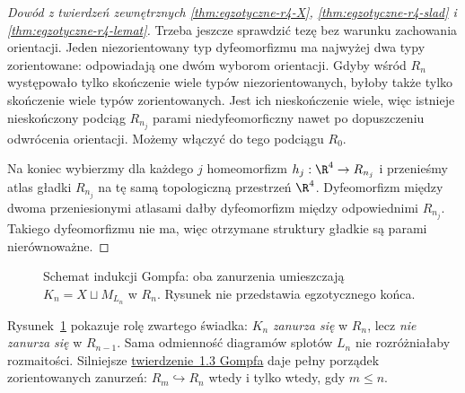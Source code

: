\begin{proof}[Dowód z twierdzeń zewnętrznych
\ref{thm:egzotyczne-r4-X},
\ref{thm:egzotyczne-r4-slad} i
\ref{thm:egzotyczne-r4-lemat}]
Trzeba jeszcze sprawdzić tezę bez warunku
zachowania orientacji. Jeden niezorientowany
typ dyfeomorfizmu ma najwyżej dwa typy
zorientowane: odpowiadają one dwóm wyborom
orientacji. Gdyby wśród $R_n$ występowało
tylko skończenie wiele typów niezorientowanych,
byłoby także tylko skończenie wiele typów
zorientowanych. Jest ich nieskończenie wiele,
więc istnieje nieskończony podciąg $R_{n_j}$
parami niedyfeomorficzny nawet po dopuszczeniu
odwrócenia orientacji.
Możemy włączyć do tego podciągu $R_0$.

Na koniec wybierzmy dla każdego $j$ homeomorfizm
$h_j:\R^4\to R_{n_j}$ i przenieśmy atlas gładki
$R_{n_j}$ na tę samą topologiczną przestrzeń
$\R^4$. Dyfeomorfizm między dwoma przeniesionymi
atlasami dałby dyfeomorfizm między odpowiednimi
$R_{n_j}$. Takiego dyfeomorfizmu nie ma, więc
otrzymane struktury gładkie są parami nierównoważne.
\end{proof}

\begin{figure}[htbp]
\centering
{}
\caption{Schemat indukcji Gompfa: oba zanurzenia
umieszczają $K_n=X\sqcup M_{L_n}$ w $R_n$.
Rysunek nie przedstawia egzotycznego końca.}
\label{fig:egzotyczne-r4-indukcja}
\end{figure}

Rysunek~\ref{fig:egzotyczne-r4-indukcja} pokazuje
rolę zwartego świadka: $K_n$ \emph{zanurza się}
w $R_n$, lecz \emph{nie zanurza się} w $R_{n-1}$.
Sama odmienność diagramów splotów $L_n$ nie
rozróżniałaby rozmaitości. Silniejsze
\href{https://doi.org/10.4310/jdg/1214439566}
{twierdzenie~1.3 Gompfa} daje pełny porządek
zorientowanych zanurzeń:
$R_m\hookrightarrow R_n$ wtedy i tylko wtedy,
gdy $m\leq n$.

